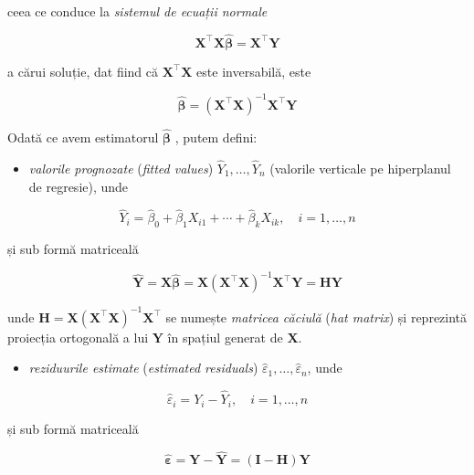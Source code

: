 \documentclass[]{article}
\providecommand{\tightlist}{%
  \setlength{\itemsep}{0pt}\setlength{\parskip}{0pt}}
\begin{document}
ceea ce conduce la \emph{sistemul de ecuații normale}

\[
\mathbf{X}^\intercal\mathbf{X}\hat{\boldsymbol{\beta}}=\mathbf{X}^\intercal\mathbf{Y}
\]

a cărui soluție, dat fiind că \(\mathbf{X}^\intercal\mathbf{X}\) este
inversabilă, este

\[
\hat{\boldsymbol{\beta}}=(\mathbf{X}^\intercal\mathbf{X})^{-1}\mathbf{X}^\intercal\mathbf{Y}
\]

Odată ce avem estimatorul \(\hat{\boldsymbol{\beta}}\) , putem defini:

\begin{itemize}
\tightlist
\item
  \emph{valorile prognozate} (\emph{fitted values})
  \(\hat Y_1,\ldots,\hat Y_n\) (valorile verticale pe hiperplanul de
  regresie), unde
\end{itemize}

\[
\hat Y_i=\hat\beta_0+\hat\beta_1X_{i1}+\cdots+\hat\beta_kX_{ik},\quad i=1,\ldots,n
\]

și sub formă matriceală

\[
\hat{\mathbf{Y}}=\mathbf{X}\hat{\boldsymbol{\beta}}=\mathbf{X}(\mathbf{X}^\intercal\mathbf{X})^{-1}\mathbf{X}^\intercal\mathbf{Y}=\mathbf{H}\mathbf{Y}
\]

unde
\(\mathbf{H}=\mathbf{X}(\mathbf{X}^\intercal\mathbf{X})^{-1}\mathbf{X}^\intercal\)
se numește \emph{matricea căciulă} (\emph{hat matrix}) și reprezintă
proiecția ortogonală a lui \(\mathbf{Y}\) în spațiul generat de
\(\mathbf{X}\).

\begin{itemize}
\tightlist
\item
  \emph{reziduurile estimate} (\emph{estimated residuals})
  \(\hat \varepsilon_1,\ldots,\hat \varepsilon_n\), unde
\end{itemize}

\[
\hat\varepsilon_i=Y_i-\hat Y_i,\quad i=1,\ldots,n
\]

și sub formă matriceală

\[
\hat{\boldsymbol\varepsilon} = \boldsymbol Y - \hat{\boldsymbol Y} = (\boldsymbol I-\boldsymbol H)\boldsymbol Y
\]
\end{document}
